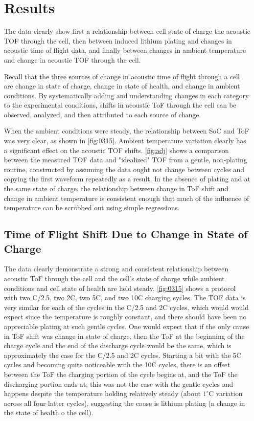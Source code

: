 \chapter{Results}

The data clearly show first a relationship between cell state of charge the acoustic TOF through the cell, then between induced lithium plating and changes in acoustic time of flight data, and finally between changes in ambient temperature and change in acoustic TOF through the cell. 

Recall that the three sources of change in acoustic time of flight through a cell are change in state of charge, change in state of health, and change in ambient conditions. 
By systematically adding and understanding changes in each category to the experimental conditions, shifts in acoustic ToF through the cell can be observed, analyzed, and then attributed to each source of change.

When the ambient conditions were steady, the relationship between SoC and ToF was very clear, as shown in \hyperref[fig:0315]{\cref{fig:0315}}. Ambient temperature variation clearly has a significant effect on the acoustic TOF shifts. \hyperref[fig:adj]{\cref{fig:adj}} shows a comparison between the measured TOF data and "idealized" TOF from a gentle, non-plating routine, constructed by assuming the data ought not change between cycles and copying the first waveform repeatedly as a result. In the absence of plating and at the same state of charge, the relationship between change in ToF shift and change in ambient temperature is consistent enough that much of the influence of temperature can be scrubbed out using simple regressions.

\section{Time of Flight Shift Due to Change in State of Charge}
The data clearly demonstrate a strong and consistent relationship between acoustic ToF through the cell and the cell's state of charge while ambient conditions and cell state of health are held steady.  \hyperref[fig:0315]{\cref{fig:0315}} shows a protocol with two C/2.5, two 2C, two 5C, and two 10C charging cycles. The TOF data is very similar for each of the cycles in the C/2.5 and 2C cycles, which would would expect since the temperature is roughly constant, and there should have been no appreciable plating at such gentle cycles. One would expect that if the only cause in ToF shift was change in state of charge, then the ToF at the beginning of the charge cycle and the end of the discharge cycle would be the same, which is approximately the case for the C/2.5 and 2C cycles. Starting a bit with the 5C cycles and becoming quite noticeable with the 10C cycles, there is an offset between the ToF the charging portion of the cycle begins at, and the ToF the discharging portion ends at; this was not the case with the gentle cycles and happens despite the temperature holding relatively steady (about $1^{\circ}$C variation across all four latter cycles), suggesting the cause is lithium plating (a change in the state of health o the cell).

